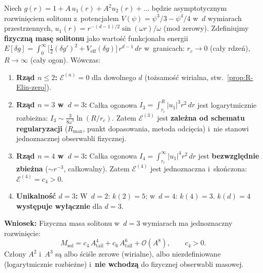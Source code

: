 
\begin{theorem}[Jednoznaczno\'s\'c $k = 4$
  jako wyk\l{}adnika masowego w~$d = 3$]%
\label{thm:R-k4-definite}
Niech $g(r) = 1 + A\,u_1(r) + A^2 u_2(r) + \ldots$ b\k{e}dzie
asymptotycznym rozwini\k{e}ciem solitonu z~potencja\l{}em
$V(\psi) = \psi^3/3 - \psi^4/4$ w~$d$ wymiarach przestrzennych,
$u_1(r) = r^{-(d-1)/2}\sin(\omega r)/\omega$ (mod zerowy).
Zdefiniujmy \textbf{fizyczn\k{a} mas\k{e} solitonu}
jako warto\'s\'c funkcjona\l{}u energii
$E[\delta g] = \int_0^\infty \bigl[\tfrac{1}{2}(\delta g')^2
  + V_{\mathrm{eff}}(\delta g)\bigr]\,r^{d-1}\,dr$
w~granicach: $r_c \to 0$ (ca\l{}y rdze\'n), $R \to \infty$
(ca\l{}y ogon). W\'owczas:
\begin{enumerate}[nosep]
  \item \textbf{Rz\k{a}d $n \le 2$:}
    $\mathcal{E}^{(n)} = 0$ dla dowolnego $d$
    (to\.zsamo\'s\'c wirialna, stw.~\ref{prop:R-Elin-zero}).

  \item \textbf{Rz\k{a}d $n = 3$ w~$d = 3$:}
    Ca\l{}ka ogonowa $I_3 = \int_{r_c}^R |u_1|^3 r^2\,dr$
    jest logarytmicznie rozbie\.zna:
    $I_3 \sim \tfrac{3}{8\omega^3}\ln(R/r_c)$.
    Zatem $\mathcal{E}^{(3)}$ jest
    \textbf{zale\.zna od schematu regularyzacji}
    ($R_{\max}$, punkt dopasowania, metoda odci\k{e}cia)
    i~nie stanowi jednoznacznej obserwabli fizycznej.

  \item \textbf{Rz\k{a}d $n = 4$ w~$d = 3$:}
    Ca\l{}ka ogonowa $I_4 = \int_{r_c}^\infty |u_1|^4 r^2\,dr$
    jest \textbf{bezwzgl\k{e}dnie zbie\.zna}
    ($\sim r^{-3}$, ca\l{}kowalny).
    Zatem $\mathcal{E}^{(4)}$ jest jednoznaczna
    i~sko\'nczona: $\mathcal{E}^{(4)} = c_4 > 0$.

  \item \textbf{Unikalno\'s\'c $d = 3$:}
    W~$d = 2$: $k(2) = 5$;
    w~$d = 4$: $k(4) = 3$.
    $k(d) = 4$ \textbf{wyst\k{e}puje wy\l{}\k{a}cznie} dla $d = 3$.
\end{enumerate}

\noindent\textbf{Wniosek:}
Fizyczna masa solitonu w~$d = 3$ wymiarach ma jednoznaczny
rozwini\k{e}cie:
\begin{equation}\label{eq:R-mass-definite}
  \boxed{M_{\mathrm{sol}} = c_4\,A_{\mathrm{tail}}^4
  + c_6\,A_{\mathrm{tail}}^6 + \mathcal{O}(A^8),
  \qquad c_4 > 0.}
\end{equation}
Cz\l{}ony $A^2$ i~$A^3$ s\k{a} albo \'sci\'sle zerowe (wirialne),
albo niezdefiniowane (logarytmicznie rozbie\.zne)
i~\textbf{nie wchodz\k{a}} do fizycznej obserwabli masowej.
\end{theorem}

